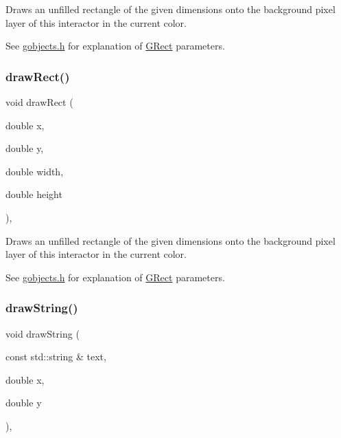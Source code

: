 Draws an unfilled rectangle of the given dimensions onto the background pixel layer of this interactor in the current color. 

See \mbox{\hyperlink{gobjects_8h_source}{gobjects.\+h}} for explanation of \mbox{\hyperlink{classGRect}{G\+Rect}} parameters. \mbox{\label{classGDrawingSurface_a4148e770ffc5474153aadd4814dbd708}} 
\subsubsection{\texorpdfstring{draw\+Rect()}{drawRect()}\hspace{0.1cm}{\footnotesize\ttfamily [2/2]}}
{\footnotesize\ttfamily void draw\+Rect (\begin{DoxyParamCaption}\item[{double}]{x,  }\item[{double}]{y,  }\item[{double}]{width,  }\item[{double}]{height }\end{DoxyParamCaption})\hspace{0.3cm}{\ttfamily [virtual]}, {\ttfamily [inherited]}}



Draws an unfilled rectangle of the given dimensions onto the background pixel layer of this interactor in the current color. 

See \mbox{\hyperlink{gobjects_8h_source}{gobjects.\+h}} for explanation of \mbox{\hyperlink{classGRect}{G\+Rect}} parameters. \mbox{\label{classGDrawingSurface_ad4e8551a753a77135792bbee97013675}} 
\subsubsection{\texorpdfstring{draw\+String()}{drawString()}}
{\footnotesize\ttfamily void draw\+String (\begin{DoxyParamCaption}\item[{const std\+::string \&}]{text,  }\item[{double}]{x,  }\item[{double}]{y }\end{DoxyParamCaption})\hspace{0.3cm}{\ttfamily [virtual]}, {\ttfamily [inherited]}}



